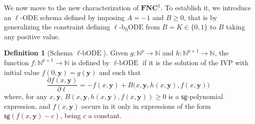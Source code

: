 \documentclass[11pt, oneside]{article}
\newcommand{\fun}[1]{\mathsf{#1}}
\newcommand{\Nat}{\mathbb{N}}
\newcommand{\NC}{\mathbf{FNC}}
\newcommand{\tu}[1]{\mathbf{#1}}
\theoremstyle{definition}
\newtheorem{defn}{Definition}
\newcommand{\schODE}{\ell\text{-b}_0\text{ODE}}
\newcommand{\chODE}{\ell\text{-bODE}}
\begin{document}

We now move to the new characterization of $\NC^1$.
%
To establish it, we introduce an $\ell$-ODE schema defined by imposing $A=-1$ and $B\ge 0$, that is by generalizing the constraint defining $\schODE$ from $B=K\in \{0,1\}$ to $B$ taking any positive value.


\begin{defn}[Schema $\chODE$]
    Given $g:\Nat^p \to \Nat$ and $h:\Nat^{p+1} \to \Nat$, the function $f:\Nat^{p+1} \to \Nat$ is defined by $\chODE$ if it is the solution of the IVP with initial value $f(0, \tu y)=g(\tu y)$ and such that
    $$
        \frac{\partial f(x, \tu y)}{\partial \ell} = -f(x, \tu y) + B\big(x, \tu y, h(x, \tu y), f(x, \tu y)\big)
    $$
    where, for any $x, \tu y$, $B(x,\tu y, h(x, \tu y), f(x, \tu y)) \ge 0$ is a $\fun{sg}$-polynomial expression, and $f(x, \tu y)$ occurs in it only in expressions of the form $\fun{sg}(f(x, \tu y)-c)$, being $c$ a constant.
\end{defn}
\end{document}
